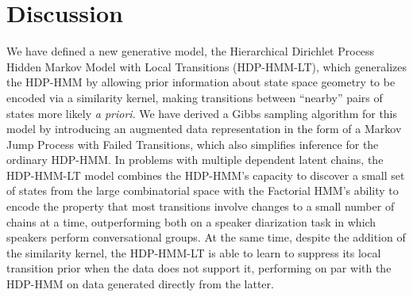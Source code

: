 \section{Discussion}
\label{sec:discussion}

We have defined a new generative model, the Hierarchical Dirichlet Process Hidden Markov Model
with Local Transitions (HDP-HMM-LT), which generalizes the HDP-HMM by
allowing prior information about state space geometry to be encoded
via a similarity kernel, making transitions between ``nearby''
pairs of states more likely {\em a priori}.  We have derived a Gibbs sampling algorithm for this
model by introducing an augmented data representation in the form of a
Markov Jump Process with Failed Transitions, which also simplifies
inference for the ordinary HDP-HMM.  In problems with
multiple dependent latent chains, the HDP-HMM-LT model
combines the HDP-HMM's capacity to discover a small set of states from
the large combinatorial space with the Factorial
HMM's ability to encode the property that most transitions involve
changes to a small number of chains at a time, outperforming both on
a speaker diarization task in which speakers perform conversational
groups.  At the same time, despite the addition of the similarity
kernel, the HDP-HMM-LT is able to learn to suppress its local
transition prior when the data does not support it, performing on par
with the HDP-HMM on data generated directly from the latter.
